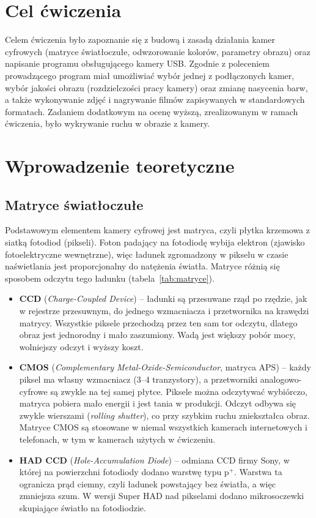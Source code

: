 



\section{Cel ćwiczenia}
Celem ćwiczenia było zapoznanie się z budową i zasadą działania kamer cyfrowych (matryce
światłoczułe, odwzorowanie kolorów, parametry obrazu) oraz napisanie programu obsługującego
kamery USB. Zgodnie z poleceniem prowadzącego program miał umożliwiać wybór jednej z podłączonych
kamer, wybór jakości obrazu (rozdzielczości pracy kamery) oraz zmianę nasycenia barw, a także
wykonywanie zdjęć i nagrywanie filmów zapisywanych w standardowych formatach. Zadaniem dodatkowym
na ocenę wyższą, zrealizowanym w ramach ćwiczenia, było wykrywanie ruchu w obrazie z kamery.

\section{Wprowadzenie teoretyczne}
\subsection{Matryce światłoczułe}
Podstawowym elementem kamery cyfrowej jest matryca, czyli płytka krzemowa z siatką fotodiod
(pikseli). Foton padający na fotodiodę wybija elektron (zjawisko fotoelektryczne wewnętrzne), więc
ładunek zgromadzony w pikselu w czasie naświetlania jest proporcjonalny do natężenia światła.
Matryce różnią się sposobem odczytu tego ładunku (tabela~\ref{tab:matryce}).

\begin{itemize}
  \item \textbf{CCD} (\emph{Charge-Coupled Device}) -- ładunki są przesuwane rząd po rzędzie,
    jak w rejestrze przesuwnym, do jednego wzmacniacza i przetwornika na krawędzi matrycy.
    Wszystkie piksele przechodzą przez ten sam tor odczytu, dlatego obraz jest jednorodny
    i mało zaszumiony. Wadą jest większy pobór mocy, wolniejszy odczyt i wyższy koszt.
  \item \textbf{CMOS} (\emph{Complementary Metal-Oxide-Semiconductor}, matryca APS) -- każdy piksel
    ma własny wzmacniacz (3--4 tranzystory), a przetworniki analogowo-cyfrowe są zwykle na tej
    samej płytce. Piksele można odczytywać wybiórczo, matryca pobiera mało energii i jest tania
    w produkcji. Odczyt odbywa się zwykle wierszami (\emph{rolling shutter}), co przy szybkim ruchu
    zniekształca obraz. Matryce CMOS są stosowane w niemal wszystkich kamerach internetowych
    i telefonach, w tym w kamerach użytych w ćwiczeniu.
  \item \textbf{HAD CCD} (\emph{Hole-Accumulation Diode}) -- odmiana CCD firmy Sony, w której na
    powierzchni fotodiody dodano warstwę typu p$^+$. Warstwa ta ogranicza prąd ciemny, czyli ładunek
    powstający bez światła, a więc zmniejsza szum. W wersji Super HAD nad pikselami dodano
    mikrosoczewki skupiające światło na fotodiodzie.
\end{itemize}

